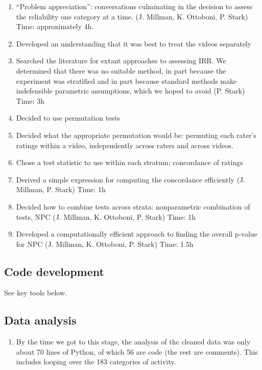 \documentclass[]{article}
\begin{document}
  \begin{enumerate}
  \def\labelenumii{\roman{enumii}.}
  \itemsep1pt\parskip0pt
  \item
    ``Problem appreciation'': conversations culminating in the decision
    to assess the reliability one category at a time. (J. Millman, K.
    Ottoboni, P. Stark) Time: approximately 4h.
  \item
    Developed an understanding that it was best to treat the videos
    separately
  \item
    Searched the literature for extant approaches to assessing IRR. We
    determined that there was no suitable method, in part because the
    experiment was stratified and in part because standard methods make
    indefensible parametric assumptions, which we hoped to avoid (P.
    Stark) Time: 3h
  \item
    Decided to use permutation tests
  \item
    Decided what the appropriate permutation would be: permuting each
    rater's ratings within a video, independently across raters and
    across videos.
  \item
    Chose a test statistic to use within each stratum: concordance of
    ratings
  \item
    Derived a simple expression for computing the concordance
    efficiently (J. Millman, P. Stark) Time: 1h
  \item
    Decided how to combine tests across strata: nonparametric
    combination of tests, NPC (J. Millman, K. Ottoboni, P. Stark) Time:
    1h
  \item
    Developed a computationally efficient approach to finding the
    overall p-value for NPC (J. Millman, K. Ottoboni, P. Stark) Time:
    1.5h
  \end{enumerate}
  
\subsection{Code development}

See key tools below.
  
\subsection{Data analysis}

  \begin{enumerate}
  \def\labelenumii{\roman{enumii}.}
  \itemsep1pt\parskip0pt
  \item
    By the time we got to this stage, the analysis of the cleaned data
    was only about 70 lines of Python, of which 56 are code (the rest
    are comments). This includes looping over the 183 categories of
    activity.
  \end{enumerate}
\end{document}
